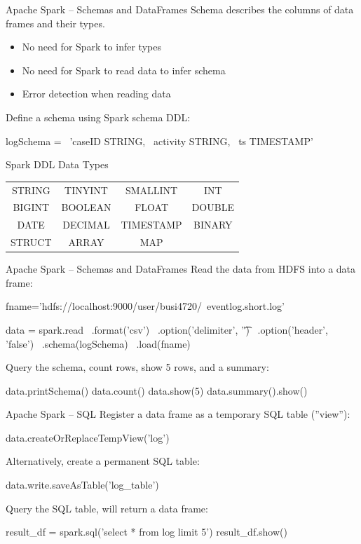 \documentclass[ignorenonframetext,xcolor=x11names]{beamer}
\begin{document}
\begin{frame}[label=withcode,fragile]{Apache Spark -- Schemas and DataFrames}
Schema describes the columns of data frames and their types.
\begin{itemize}
   \item No need for Spark to infer types
   \item No need for Spark to read data to infer schema
   \item Error detection when reading data
\end{itemize}
Define a schema using Spark schema DDL:
\begin{pythoncode}
logSchema = \
    'caseID STRING, \
     activity STRING, \
     ts TIMESTAMP'
\end{pythoncode}
\vspace{-\baselineskip}
\begin{block}{\small Spark DDL Data Types}
\begin{center}
\renewcommand{\arraystretch}{1.5}
\footnotesize
\begin{tabular}{cccc} 
STRING & TINYINT & SMALLINT & INT \\
BIGINT & BOOLEAN & FLOAT & DOUBLE \\
DATE & DECIMAL & TIMESTAMP & BINARY \\ \hline
STRUCT & ARRAY & MAP \\
\end{tabular}
\end{center}
\end{block}
\end{frame}


\begin{frame}[label=withcode,fragile]{Apache Spark -- Schemas and DataFrames}
Read the data from HDFS into a data frame:
\begin{pythoncode}
fname='hdfs://localhost:9000/user/busi4720/\
eventlog.short.log'

data = spark.read \
    .format('csv') \
    .option('delimiter', '\t') \
    .option('header', 'false') \
    .schema(logSchema) \
    .load(fname)
\end{pythoncode}
Query the schema, count rows, show 5 rows, and a summary:
\begin{pythoncode}
data.printSchema()
data.count()
data.show(5)
data.summary().show()
\end{pythoncode}
\end{frame}


\begin{frame}[label=withcode,fragile]{Apache Spark -- SQL}
\small
Register a data frame as a temporary SQL table (''view''):
\begin{pythoncode}
data.createOrReplaceTempView('log')
\end{pythoncode}
Alternatively, create a permanent SQL table:
\begin{pythoncode}
data.write.saveAsTable('log_table')
\end{pythoncode}
Query the SQL table, will return a data frame:
\begin{pythoncode}
result_df = spark.sql('select * from log limit 5')
result_df.show()
\end{pythoncode}
\end{frame}
\end{document}
